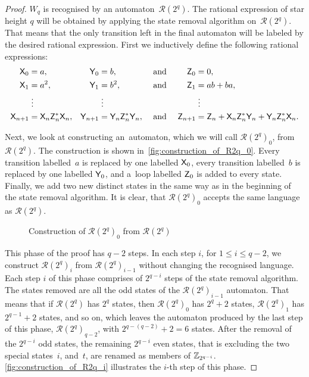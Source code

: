 \begin{proof}
    $W_q$ is recognised by an automaton~${\mathcal{R}(2^q)}$. The rational expression of star height $q$ will be obtained by applying the state removal algorithm on~${\mathcal{R}(2^q)}$. That means that the only transition left in the final automaton will be labeled by the desired rational expression. First we inductively define the following rational expressions:
    \begin{align*}
        {\mathsf{X}}_0 &= a, & {\mathsf{Y}}_0 &= b, & &\text{ and } & {\mathsf{Z}}_0 &= 0, \\
        {\mathsf{X}}_1 &= a^2, & {\mathsf{Y}}_1 &= b^2, & &\text{ and } & {\mathsf{Z}}_1 &= ab+ba, \\
        &\; \vdots & &\; \vdots & &\text{  } & &\; \vdots \\
        {\mathsf{X}}_{n+1} &= {\mathsf{X}}_n {\mathsf{Z}}_n^* {\mathsf{X}}_n, & {\mathsf{Y}}_{n+1} &= {\mathsf{Y}}_n {\mathsf{Z}}_n^* {\mathsf{Y}}_n, & &\text{ and } & {\mathsf{Z}}_{n+1} &= {\mathsf{Z}}_n + {\mathsf{X}}_n {\mathsf{Z}}_n^* {\mathsf{Y}}_n + {\mathsf{Y}}_n {\mathsf{Z}}_n^* {\mathsf{X}}_n.
    \end{align*}

    Next, we look at constructing an~automaton, which we will call ${\mathcal{R}(2^q)}_0$, from ${\mathcal{R}(2^q)}$. The construction is shown in~\autoref*{fig:construction_of_R2q_0}. Every transition labelled~$a$ is replaced by one labelled ${\mathsf{X}}_0$, every transition labelled~$b$ is replaced by one labelled ${\mathsf{Y}}_0$, and a~loop labelled ${\mathsf{Z}}_0$ is added to every state. Finally, we add two new distinct states in the same way as in the beginning of the state removal algorithm. It is clear, that ${\mathcal{R}(2^q)}_0$ accepts the same language as ${\mathcal{R}(2^q)}$.

    \begin{figure}[h]%
        \centering
        \hspace{60pt}%
        \caption{Construction of ${\mathcal{R}(2^q)}_0$ from ${\mathcal{R}(2^q)}$}\label{fig:construction_of_R2q_0}%
    \end{figure}

    This phase of the proof has $q-2$ steps. In each step $i$, for $1 \leq i \leq q-2$, we construct ${\mathcal{R}(2^q)}_i$ from ${\mathcal{R}(2^q)}_{i-1}$ without changing the recognised language. Each step $i$ of this phase comprises of $2^{q-i}$ steps of the state removal algorithm. The states removed are all the odd states of the ${\mathcal{R}(2^q)}_{i-1}$ automaton. That means that if ${\mathcal{R}(2^q)}$ has $2^q$ states, then ${\mathcal{R}(2^q)}_0$ has $2^q + 2$ states, ${\mathcal{R}(2^q)}_1$ has $2^{q-1} + 2$ states, and so on, which leaves the automaton produced by the last step of this phase, ${\mathcal{R}(2^q)}_{q-2}$, with $2^{q-(q-2)} + 2 = 6$ states. After the removal of the $2^{q-i}$ odd states, the remaining $2^{q-i}$ even states, that is excluding the two special states~$i$, and~$t$, are renamed as members of $\mathbb{Z}_{2^{q-i}}$. \autoref*{fig:construction_of_R2q_i} illustrates the $i$-th step of this phase.


\end{proof}

